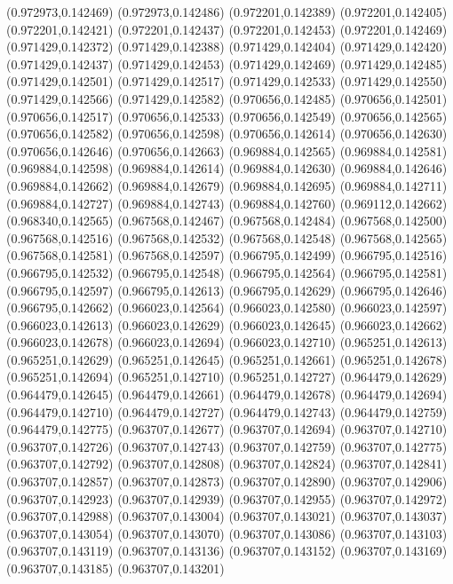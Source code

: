 (0.972973,0.142469)
(0.972973,0.142486)
(0.972201,0.142389)
(0.972201,0.142405)
(0.972201,0.142421)
(0.972201,0.142437)
(0.972201,0.142453)
(0.972201,0.142469)
(0.971429,0.142372)
(0.971429,0.142388)
(0.971429,0.142404)
(0.971429,0.142420)
(0.971429,0.142437)
(0.971429,0.142453)
(0.971429,0.142469)
(0.971429,0.142485)
(0.971429,0.142501)
(0.971429,0.142517)
(0.971429,0.142533)
(0.971429,0.142550)
(0.971429,0.142566)
(0.971429,0.142582)
(0.970656,0.142485)
(0.970656,0.142501)
(0.970656,0.142517)
(0.970656,0.142533)
(0.970656,0.142549)
(0.970656,0.142565)
(0.970656,0.142582)
(0.970656,0.142598)
(0.970656,0.142614)
(0.970656,0.142630)
(0.970656,0.142646)
(0.970656,0.142663)
(0.969884,0.142565)
(0.969884,0.142581)
(0.969884,0.142598)
(0.969884,0.142614)
(0.969884,0.142630)
(0.969884,0.142646)
(0.969884,0.142662)
(0.969884,0.142679)
(0.969884,0.142695)
(0.969884,0.142711)
(0.969884,0.142727)
(0.969884,0.142743)
(0.969884,0.142760)
(0.969112,0.142662)
(0.968340,0.142565)
(0.967568,0.142467)
(0.967568,0.142484)
(0.967568,0.142500)
(0.967568,0.142516)
(0.967568,0.142532)
(0.967568,0.142548)
(0.967568,0.142565)
(0.967568,0.142581)
(0.967568,0.142597)
(0.966795,0.142499)
(0.966795,0.142516)
(0.966795,0.142532)
(0.966795,0.142548)
(0.966795,0.142564)
(0.966795,0.142581)
(0.966795,0.142597)
(0.966795,0.142613)
(0.966795,0.142629)
(0.966795,0.142646)
(0.966795,0.142662)
(0.966023,0.142564)
(0.966023,0.142580)
(0.966023,0.142597)
(0.966023,0.142613)
(0.966023,0.142629)
(0.966023,0.142645)
(0.966023,0.142662)
(0.966023,0.142678)
(0.966023,0.142694)
(0.966023,0.142710)
(0.965251,0.142613)
(0.965251,0.142629)
(0.965251,0.142645)
(0.965251,0.142661)
(0.965251,0.142678)
(0.965251,0.142694)
(0.965251,0.142710)
(0.965251,0.142727)
(0.964479,0.142629)
(0.964479,0.142645)
(0.964479,0.142661)
(0.964479,0.142678)
(0.964479,0.142694)
(0.964479,0.142710)
(0.964479,0.142727)
(0.964479,0.142743)
(0.964479,0.142759)
(0.964479,0.142775)
(0.963707,0.142677)
(0.963707,0.142694)
(0.963707,0.142710)
(0.963707,0.142726)
(0.963707,0.142743)
(0.963707,0.142759)
(0.963707,0.142775)
(0.963707,0.142792)
(0.963707,0.142808)
(0.963707,0.142824)
(0.963707,0.142841)
(0.963707,0.142857)
(0.963707,0.142873)
(0.963707,0.142890)
(0.963707,0.142906)
(0.963707,0.142923)
(0.963707,0.142939)
(0.963707,0.142955)
(0.963707,0.142972)
(0.963707,0.142988)
(0.963707,0.143004)
(0.963707,0.143021)
(0.963707,0.143037)
(0.963707,0.143054)
(0.963707,0.143070)
(0.963707,0.143086)
(0.963707,0.143103)
(0.963707,0.143119)
(0.963707,0.143136)
(0.963707,0.143152)
(0.963707,0.143169)
(0.963707,0.143185)
(0.963707,0.143201)

